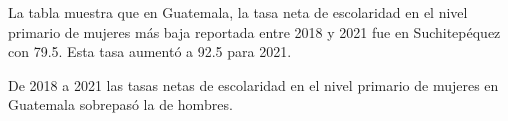 La tabla muestra que en Guatemala, la tasa neta de escolaridad en el nivel primario de mujeres más baja reportada entre 2018 y 2021 fue en Suchitepéquez con 79.5. Esta tasa aumentó a 92.5 para 2021. 

De 2018 a 2021 las tasas netas de escolaridad en el nivel primario de mujeres en Guatemala sobrepasó la de hombres. 